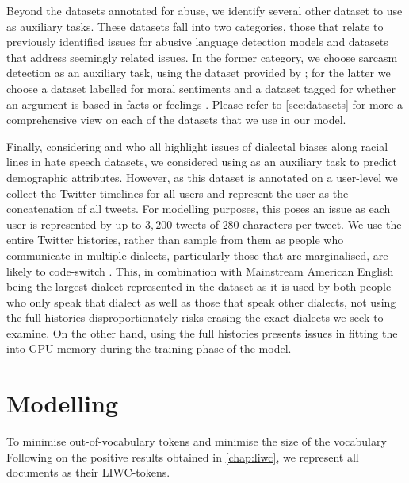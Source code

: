Beyond the datasets annotated for abuse, we identify several other dataset to use as auxiliary tasks. These datasets fall into two categories, those that relate to previously identified issues for abusive language detection models and datasets that address seemingly related issues. In the former category, we choose sarcasm detection as an auxiliary task, using the dataset provided by \citet{Oraby_sarcasm:2017}; for the latter we choose a dataset labelled for moral sentiments \citet{Hoover:2019} and a dataset tagged for whether an argument is based in facts or feelings \citet{Oraby_fact_feel:2017}. Please refer to \autoref{sec:datasets} for more a comprehensive view on each of the datasets that we use in our model.

Finally, considering \citet{Waseem:2018,Davidson:2019} and \citet{Sap:2019} who all highlight issues of dialectal biases along racial lines in hate speech datasets, we considered using \citet{Preotiuc-Unger:2018} as an auxiliary task to predict demographic attributes. However, as this dataset is annotated on a user-level we collect the Twitter timelines for all users and represent the user as the concatenation of all tweets. For modelling purposes, this poses an issue as each user is represented by up to $3,200$ tweets of $280$ characters per tweet. We use the entire Twitter histories, rather than sample from them as people who communicate in multiple dialects, particularly those that are marginalised, are likely to code-switch \cite{CITE: AAE code switching paper}. This, in combination with Mainstream American English being the largest dialect represented in the dataset as it is used by both people who only speak that dialect as well as those that speak other dialects, not using the full histories disproportionately risks erasing the exact dialects we seek to examine. On the other hand, using the full histories presents issues in fitting the into GPU memory during the training phase of the model.

\section{Modelling}

To minimise out-of-vocabulary tokens and minimise the size of the vocabulary
Following on the positive results obtained in \autoref{chap:liwc}, we represent all documents as their LIWC-tokens.




